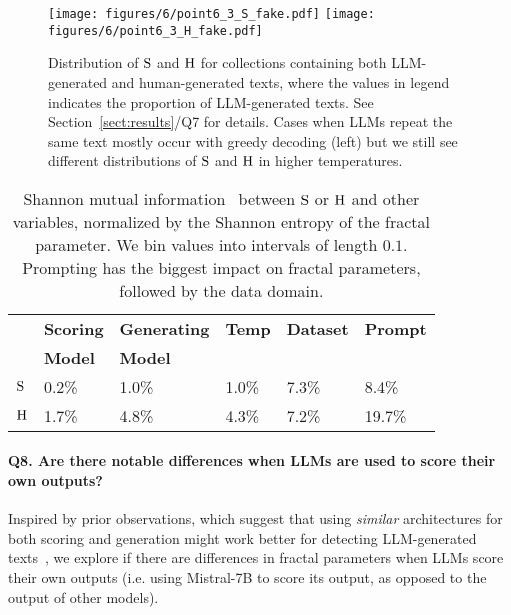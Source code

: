 

\begin{figure*}[t]
    \centering
    \texttt{[image: figures/6/point6\_3\_S\_fake.pdf]}
    \texttt{[image: figures/6/point6\_3\_H\_fake.pdf]}
    \caption{Distribution of $\mathrm{S}$ and $\mathrm{H}$ for collections containing both LLM-generated and human-generated texts, where the values in legend indicates the proportion of LLM-generated texts. See Section~\ref{sect:results}/Q7 for details. Cases when LLMs repeat the same text mostly occur with greedy decoding (left) but we still see different distributions of $\mathrm{S}$ and $\mathrm{H}$ in higher temperatures.}
    \label{fig:s_over_h_full}
\end{figure*}
\begin{table}[t]
    \centering\scriptsize
    \caption{Shannon mutual information~\citep{shannon1948mathematical} between $\mathrm{S}$ or $\mathrm{H}$ and other variables, normalized by the Shannon entropy of the fractal parameter. We bin  values into intervals of length $0.1$. Prompting has the biggest impact on fractal parameters, followed by the data domain. 
    }
    \label{tab:mutual_info}
\begin{tabularx}{\linewidth}{l|X|X|X|X|X}
  \toprule
  &\bf Scoring & \bf Generating & \bf Temp &\bf Dataset &\bf Prompt \\
  &\bf Model & \bf Model & & & \\
  \midrule
  $\mathrm{S}$ &  0.2\% & 1.0\% & 1.0\% & 7.3\% & 8.4\%\\
   $\mathrm{H}$ &  1.7\% & 4.8\% & 4.3\% & 7.2\% & 19.7\%\\
  \bottomrule
  \end{tabularx}
\end{table}



\paragraph{Q8. Are there notable differences when LLMs are used to score their own outputs?}
Inspired by prior observations, which suggest that using \emph{similar} architectures for both scoring and generation might work better for detecting LLM-generated texts~\citep{10.5555/3618408.3619446,fagni2021tweepfake}, we explore if there are differences in fractal parameters when LLMs score their own outputs (i.e. using Mistral-7B to score its output, as opposed to the output of other models). 

